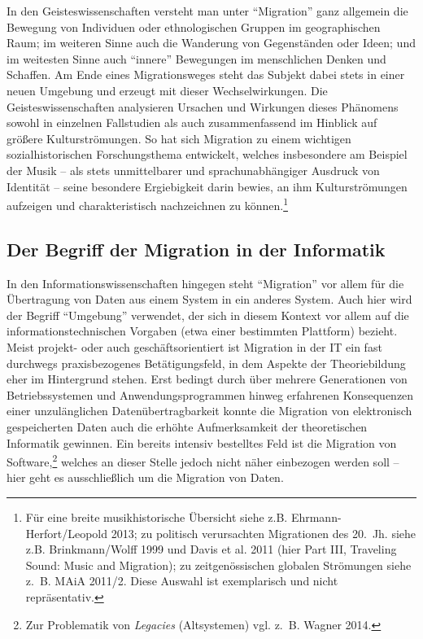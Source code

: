 \documentclass[a4paper,
fontsize=11pt,
oneside,
numbers=noperiodatend,
parskip=half-,
bibliography=totoc,
final
]{scrartcl}
\begin{document}
In den Geisteswissenschaften versteht man unter \enquote{Migration} ganz
allgemein die Bewegung von Individuen oder ethnologischen Gruppen im
geographischen Raum; im weiteren Sinne auch die Wanderung von
Gegenständen oder Ideen; und im weitesten Sinne auch \enquote{innere}
Bewegungen im menschlichen Denken und Schaffen. Am Ende eines
Migrationsweges steht das Subjekt dabei stets in einer neuen Umgebung
und erzeugt mit dieser Wechselwirkungen. Die Geisteswissenschaften
analysieren Ursachen und Wirkungen dieses Phänomens sowohl in einzelnen
Fallstudien als auch zusammenfassend im Hinblick auf größere
Kulturströmungen. So hat sich Migration zu einem wichtigen
sozialhistorischen Forschungsthema entwickelt, welches insbesondere am
Beispiel der Musik -- als stets unmittelbarer und sprachunabhängiger
Ausdruck von Identität -- seine besondere Ergiebigkeit darin bewies, an
ihm Kulturströmungen aufzeigen und charakteristisch nachzeichnen zu
können.\footnote{Für eine breite musikhistorische Übersicht siehe z.B.
  Ehrmann-Herfort/Leopold 2013; zu politisch verursachten Migrationen
  des 20.~Jh. siehe z.B. Brinkmann/Wolff 1999 und Davis et al. 2011
  (hier Part III, Traveling Sound: Music and Migration); zu
  zeitgenössischen globalen Strömungen siehe z.~B. MAiA 2011/2. Diese
  Auswahl ist exemplarisch und nicht repräsentativ.}

\subsection*{Der Begriff der Migration in der
Informatik}\label{der-begriff-der-migration-in-der-informatik}

In den Informationswissenschaften hingegen steht \enquote{Migration} vor
allem für die Übertragung von Daten aus einem System in ein anderes
System. Auch hier wird der Begriff \enquote{Umgebung} verwendet, der
sich in diesem Kontext vor allem auf die informationstechnischen
Vorgaben (etwa einer bestimmten Plattform) bezieht. Meist projekt- oder
auch geschäftsorientiert ist Migration in der IT ein fast durchwegs
praxisbezogenes Betätigungsfeld, in dem Aspekte der Theoriebildung eher
im Hintergrund stehen. Erst bedingt durch über mehrere Generationen von
Betriebssystemen und Anwendungsprogrammen hinweg erfahrenen Konsequenzen
einer unzulänglichen Datenübertragbarkeit konnte die Migration von
elektronisch gespeicherten Daten auch die erhöhte Aufmerksamkeit der
theoretischen Informatik gewinnen. Ein bereits intensiv bestelltes Feld
ist die Migration von Software,\footnote{Zur Problematik von
  \emph{Legacies} (Altsystemen) vgl. z.~B. Wagner 2014.} welches an
dieser Stelle jedoch nicht näher einbezogen werden soll -- hier geht es
ausschließlich um die Migration von Daten.
\end{document}
